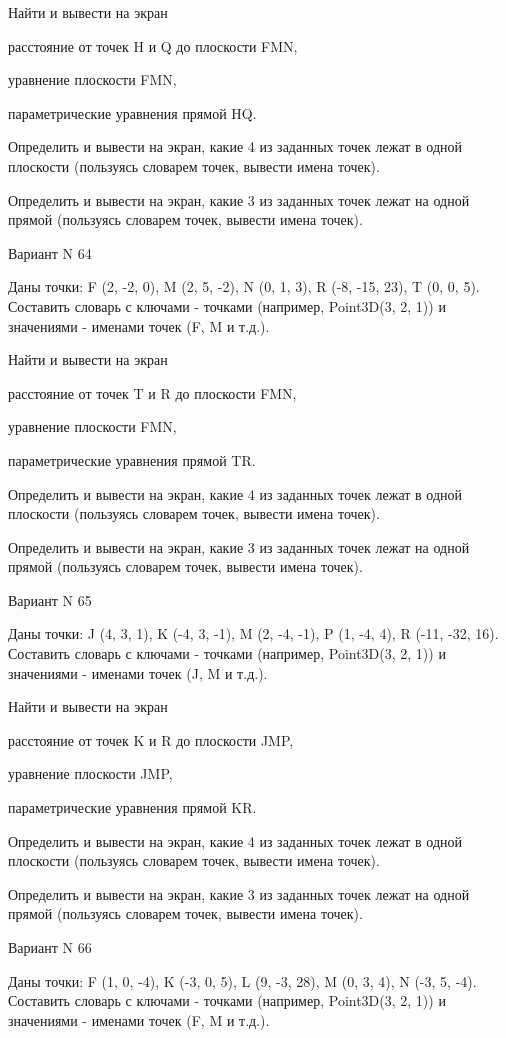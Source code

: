 \documentclass[11pt]{report}
\begin{document}
Найти и вывести на экран


расстояние от точек H и Q до плоскости FMN,


уравнение плоскости FMN,


параметрические уравнения прямой HQ.


Определить и вывести на экран, какие 4 из заданных точек лежат в одной плоскости (пользуясь словарем точек, вывести имена точек).


Определить и вывести на экран, какие 3 из заданных точек лежат на одной прямой (пользуясь словарем точек, вывести имена точек).

\newpage
Вариант N 64

Даны точки: F (2, -2, 0), M (2, 5, -2), N (0, 1, 3), R (-8, -15, 23), T (0, 0, 5).
Составить словарь с ключами - точками (например, Point3D(3, 2, 1)) и значениями - именами точек (F, M и т.д.).


Найти и вывести на экран


расстояние от точек T и R до плоскости FMN,


уравнение плоскости FMN,


параметрические уравнения прямой TR.


Определить и вывести на экран, какие 4 из заданных точек лежат в одной плоскости (пользуясь словарем точек, вывести имена точек).


Определить и вывести на экран, какие 3 из заданных точек лежат на одной прямой (пользуясь словарем точек, вывести имена точек).

\newpage
Вариант N 65

Даны точки: J (4, 3, 1), K (-4, 3, -1), M (2, -4, -1), P (1, -4, 4), R (-11, -32, 16).
Составить словарь с ключами - точками (например, Point3D(3, 2, 1)) и значениями - именами точек (J, M и т.д.).


Найти и вывести на экран


расстояние от точек K и R до плоскости JMP,


уравнение плоскости JMP,


параметрические уравнения прямой KR.


Определить и вывести на экран, какие 4 из заданных точек лежат в одной плоскости (пользуясь словарем точек, вывести имена точек).


Определить и вывести на экран, какие 3 из заданных точек лежат на одной прямой (пользуясь словарем точек, вывести имена точек).

\newpage
Вариант N 66

Даны точки: F (1, 0, -4), K (-3, 0, 5), L (9, -3, 28), M (0, 3, 4), N (-3, 5, -4).
Составить словарь с ключами - точками (например, Point3D(3, 2, 1)) и значениями - именами точек (F, M и т.д.).
\end{document}
